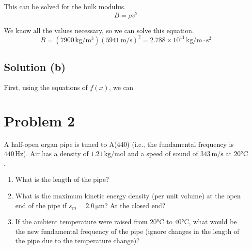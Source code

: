 \documentclass[12pt]{article}
\newcommand{\E}[1]{\times 10^{#1}}
\begin{document}
            This can be solved for the bulk modulus.
            \begin{equation}
                B   =   \rho v^2
            \end{equation}

            We know all the values necessary, so we can solve this equation.
            \begin{equation}
                B   =   (7900\,\unit{\kilo\gram/\meter^3}) (5941\,\unit{\meter/\second})^2
                    =   \boxed{2.788\E{11}\,\unit{\kilo\gram/\meter\cdot\second^2}}
            \end{equation}
        
        \subsection{Solution (b)}
            First, using the equations of $f(x)$, we can 
            
        
    \section{Problem 2}
        A half-open organ pipe is tuned to A(440) (i.e., the fundamental frequency is $440\,\unit{\hertz}$).
        Air has a density of $1.21\,\unit{\kilo\gram/\mole}$ and a speed of sound of $343\,\unit{\meter/\second}$ at $20\unit{\celsius}$.
        
        \begin{enumerate}[label=\alph*.]
            \item   What is the length of the pipe?
            \item   What is the maximum kinetic energy density (per unit volume) at the open end of the pipe if $s_m = 2.0\,\unit{\micro\meter}$?  At the closed end?
            \item   If the ambient temperature were raised from 20\unit{\celsius} to 40\unit{\celsius}, what would be the new fundamental frequency of the pipe (ignore changes in the length of the pipe due to the temperature change)?
        \end{enumerate}
    
\end{document}
